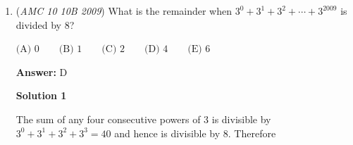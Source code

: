 \begin{enumerate}
 \textbf{Answer: }B



\textbf{Solution 1}

By the Pythagorean Theorem, $AC=\sqrt5$. Then, from the Angle Bisector Theorem, we have:

 
 \[\frac{BD}{1}=\frac{2-BD}{\sqrt5}\]
 \[BD\left(1+\frac{1}{\sqrt5}\right)=\frac{2}{\sqrt5}\]
 \[BD(\sqrt5+1)=2\]
 \[BD=\frac{2}{\sqrt5+1}=\boxed{\frac{\sqrt5-1}{2}} \implies \boxed{B}\]




\textbf{Solution 2}

Let $\theta = \angle BAD = \angle DAC$. Notice $\tan \theta = BD$ and $\tan 2 \theta = 2$. By the double angle identity, 
 \[2 = \frac{2 BD}{1 - BD^2} \implies BD = \boxed{\frac{\sqrt5 - 1}{2} \implies B}.\]

 Remarks: You could also use tangent half angle formula

 



\textbf{Solution 3}

Let $BD=y$.

 Make $DE$ a line so that it is perpendicular to $AC$. Since $AD$ is an angle bisector, $\triangle AED$ is congruent to $\triangle ABD$.Using the Pythagorean Theorem:

 $AC^2=1^2+2^2$
$AC^2=5$
$AC=\sqrt{5}$

 We know that $AE=1$ by the congruent triangles, so $EC=\sqrt{5}-1$. We know that $DE=y$, $EC=\sqrt{5}-1$, and $DC=2-y$. We now have right triangle $DEC$ and its 3 sides. Using the Pythagorean Thereom, we get:

 $y^2+(\sqrt{5}-1)^2=(2-y)^2$
$-4y=2-2\sqrt{5}$

 So, $y=BD=\boxed{\frac{\sqrt5-1}{2} \implies B}.$



	\item (\textit{AMC 10 10B 2009}) What is the remainder when $3^0 + 3^1 + 3^2 + \cdots + 3^{2009}$ is divided by 8?


 $\text{(A) } 0 \qquad \text{(B) } 1 \qquad \text{(C) } 2 \qquad \text{(D) } 4 \qquad \text{(E) } 6$

 \textbf{Answer: }D



\textbf{Solution 1}

The sum of any four consecutive powers of 3 is divisible by $3^0 + 3^1 + 3^2 +3^3 = 40$ and hence is divisible by 8. Therefore


\end{enumerate}
